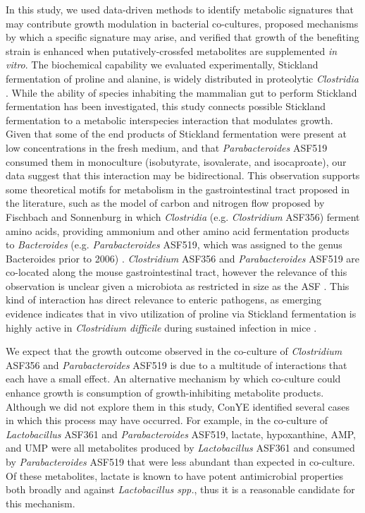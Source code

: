 \documentclass[11pt,twocolumn,notitlepage,openany,twoside]{book}
\begin{document}
\begin{refsection}
In this study, we used data-driven methods to identify metabolic signatures that may contribute growth modulation in bacterial co-cultures, proposed mechanisms by which a specific signature may arise, and verified that growth of the benefiting strain is enhanced when putatively-crossfed metabolites are supplemented \textit{in vitro}. The biochemical capability we evaluated experimentally, Stickland fermentation of proline and alanine, is widely distributed in proteolytic \textit{Clostridia} \cite{Mead1971-oa}. While the ability of species inhabiting the mammalian gut to perform Stickland fermentation has been investigated, this study connects possible Stickland fermentation to a metabolic interspecies interaction that modulates growth. Given that some of the end products of Stickland fermentation were present at low concentrations in the fresh medium, and that \textit{Parabacteroides} ASF519 consumed them in monoculture (isobutyrate, isovalerate, and isocaproate), our data suggest that this interaction may be bidirectional. This observation supports some theoretical motifs for metabolism in the gastrointestinal tract proposed in the literature, such as the model of carbon and nitrogen flow proposed by Fischbach and Sonnenburg in which \textit{Clostridia} (e.g. \textit{Clostridium} ASF356) ferment amino acids, providing ammonium and other amino acid fermentation products to \textit{Bacteroides} (e.g. \textit{Parabacteroides} ASF519, which was assigned to the genus Bacteroides prior to 2006) \cite{Fischbach2011-wg,Sakamoto2006-oz}. \textit{Clostridium} ASF356 and \textit{Parabacteroides} ASF519 are co-located along the mouse gastrointestinal tract, however the relevance of this observation is unclear given a microbiota as restricted in size as the ASF \cite{Sarma-Rupavtarm2004-jv}. This kind of interaction has direct relevance to enteric pathogens, as emerging evidence indicates that in vivo utilization of proline via Stickland fermentation is highly active in \textit{Clostridium difficile} during sustained infection in mice \cite{Fletcher2018-ws,Jenior2017-lv,Jenior2017-zv}.

We expect that the growth outcome observed in the co-culture of \textit{Clostridium} ASF356 and \textit{Parabacteroides} ASF519 is due to a multitude of interactions that each have a small effect. An alternative mechanism by which co-culture could enhance growth is consumption of growth-inhibiting metabolite products. Although we did not explore them in this study, ConYE identified several cases in which this process may have occurred. For example, in the co-culture of \textit{Lactobacillus} ASF361 and \textit{Parabacteroides} ASF519, lactate, hypoxanthine, AMP, and UMP were all metabolites produced by \textit{Lactobacillus} ASF361 and consumed by \textit{Parabacteroides} ASF519 that were less abundant than expected in co-culture. Of these metabolites, lactate is known to have potent antimicrobial properties both broadly and against \textit{Lactobacillus spp.}\cite{Shelef1994-lb}, thus it is a reasonable candidate for this mechanism.


\end{refsection}
\end{document}
